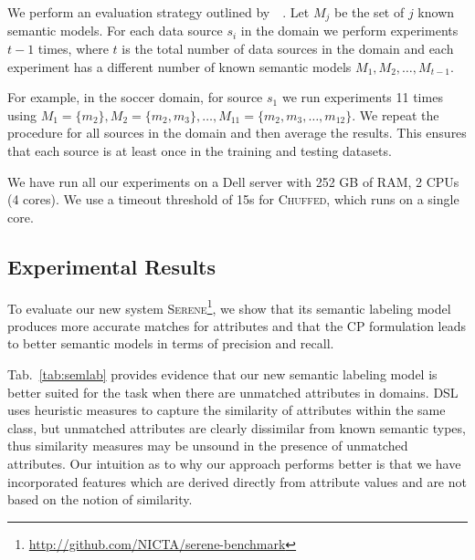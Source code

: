 \documentclass[letterpaper]{article} %
\newcommand{\authornote}[3]{
  {\fbox{\sc 
  #1}:$\blacktriangleright$\textcolor{#2}{\small{#3}}$\blacktriangleleft$}%
}
\newcommand{\npr}[1]{\authornote{NPR}{orange}{#1}}
\newcommand{\chuffed}{\textsc{Chuffed}}
\newcommand{\serene}{\textsc{Serene}}
\newcommand{\ignore}[1]{}
\newcommand{\forijcai}[1]{}
\newcommand{\citeasnoun}[1]{\citeauthor{#1}~\shortcite{#1}}
\begin{document}
We perform an evaluation strategy outlined by~\citeasnoun{taheriyan2016learning}.
Let $M_j$ be the set of $j$ known semantic models.
For each data source $s_i$ in the domain we perform experiments $t-1$ times,
where $t$ is the total number of data sources in the domain and each experiment has a different number of known semantic models $M_1, M_2, \ldots, M_{t-1}$.
\forijcai{The case with $M_{t-1}$ known semantic models corresponds to leave-one-out validation strategy.} 
For example, in the soccer domain, for source $s_1$ we run experiments 11 times using $M_1=\{m_2\}, M_2=\{m_2, m_3\}, \ldots, M_{11}=\{m_2, m_3, \ldots, m_{12}\}$.
We repeat the procedure for all sources in the domain and then average the results.
This \forijcai{procedure} ensures that each source is at least once in the training and testing datasets.


We have run all our experiments on a Dell server with 252 GB of RAM, 2 CPUs (4 cores).
We use a timeout threshold of 15s for \chuffed{}, which 
runs on a single core.

\subsection{Experimental Results}

To evaluate our new system \serene{}\footnote{ \url{http://github.com/NICTA/serene-benchmark}}, we show that its semantic labeling model 
produces more accurate matches for attributes and that the CP formulation leads 
to better semantic models in terms of precision and recall.

\ignore{We have developed a new approach for semantic labeling which can 
efficiently handle the \emph{unknown} class.}
\ignore{We demonstrate its efficiency by comparing against the state-of-the-art 
approach DSL~\cite{Pham:semantic}. } %
Tab.~\ref{tab:semlab} provides evidence that our new semantic labeling model is better suited for the task when there are unmatched attributes in domains.
DSL uses heuristic measures to capture the similarity of attributes within the same class, but 
unmatched attributes are clearly dissimilar from known semantic types, thus similarity measures may be unsound in the presence of unmatched attributes.
Our intuition as to why our approach performs better is that we have 
incorporated features which are derived directly from attribute values and are 
not based on the notion of similarity.
\end{document}
